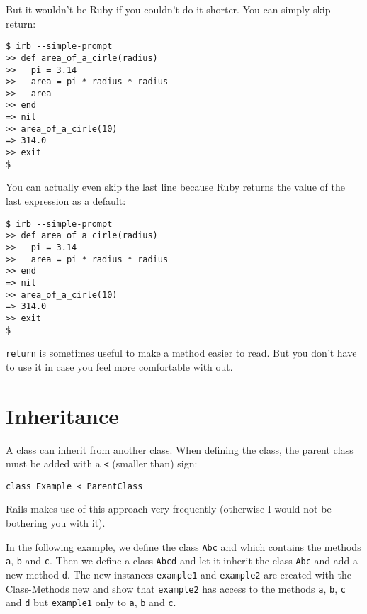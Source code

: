 \documentclass[a4paper]{book}
\newcounter{tab}[chapter]
\begin{document}
But it wouldn't be Ruby if you couldn't do it shorter. You can simply skip return:

\begin{shaded}\begin{verbatim}
$ irb --simple-prompt
>> def area_of_a_cirle(radius)
>>   pi = 3.14
>>   area = pi * radius * radius
>>   area
>> end
=> nil
>> area_of_a_cirle(10)
=> 314.0
>> exit
$
\end{verbatim}\end{shaded}

You can actually even skip the last line because Ruby returns the value of the last expression as a default:

\begin{shaded}\begin{verbatim}
$ irb --simple-prompt
>> def area_of_a_cirle(radius)
>>   pi = 3.14
>>   area = pi * radius * radius
>> end
=> nil
>> area_of_a_cirle(10)
=> 314.0
>> exit
$
\end{verbatim}\end{shaded}

\texttt{return} is sometimes useful to make a method easier to read. But you don't have to use it in case you feel more comfortable with out.

\section{Inheritance}\label{inheritance}

A class can inherit from another class. When defining the class, the parent class must be added with a \texttt{\textless{}} (smaller than) sign:

\begin{shaded}\begin{verbatim}
class Example < ParentClass
\end{verbatim}\end{shaded}

Rails makes use of this approach very frequently (otherwise I would not be bothering you with it).

In the following example, we define the class \texttt{Abc} and which contains the methods \texttt{a}, \texttt{b} and \texttt{c}. Then we define a class \texttt{Abcd} and let it inherit the class \texttt{Abc} and add a new method \texttt{d}. The new instances \texttt{example1} and \texttt{example2} are created with the Class-Methods new and show that \texttt{example2} has access to the methods \texttt{a}, \texttt{b}, \texttt{c} and \texttt{d} but \texttt{example1} only to \texttt{a}, \texttt{b} and \texttt{c}.
\end{document}
